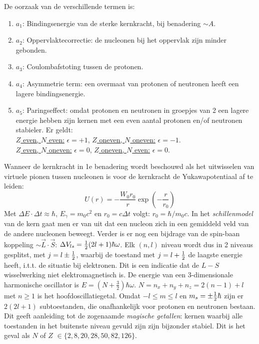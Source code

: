 De oorzaak van de verschillende termen is:
\begin{enumerate}
\item $a_1$: Bindingsenergie van de sterke kernkracht, bij benadering $\sim A$.
\item $a_2$: Oppervlaktecorrectie: de nucleonen bij het oppervlak zijn minder
             gebonden.
\item $a_3$: Coulombafstoting tussen de protonen.
\item $a_4$: Asymmetrie term: een overmaat van protonen of neutronen heeft een
             lagere bindingsenergie.
\item $a_5$: Paringseffect: omdat protonen en neutronen in groepjes van 2
             een lagere energie hebben zijn kernen met een even aantal
             protonen en/of neutronen stabieler. Er geldt:\\[2mm]
             \underline{$Z$ even, $N$ even:} $\epsilon=+1$,
             \underline{$Z$ oneven, $N$ oneven:} $\epsilon=-1$.\\
             \underline{$Z$ even, $N$ oneven:} $\epsilon=0$,
             \underline{$Z$ oneven, $N$ even:} $\epsilon=0$.
\end{enumerate}
Wanneer de kernkracht in 1e benadering wordt beschouwd als het uitwisselen
van virtuele pionen tussen nucleonen is voor de kernkracht de
Yukawapotentiaal af te leiden:
\[
U(r)=-\frac{W_0r_0}{r}\exp\left(-\frac{r}{r_0}\right)
\]
Met $\Delta E\cdot\Delta t\approx\hbar$, $E_\gamma=m_0c^2$ en $r_0=c\Delta t$
volgt: $r_0=\hbar/m_0c$.
\npar
In het {\it schillenmodel} van de kern gaat men er van uit dat een nucleon
zich in een gemiddeld veld van de andere nucleonen beweegt. Verder is er
nog een bijdrage van de spin-baan koppeling $\sim\vec{L}\cdot\vec{S}$:
$\Delta V_{ls}=\mbox{$\frac{1}{2}$}(2l+1)\hbar\omega$. Elk $(n,l)$ niveau wordt dus in
2 niveaus gesplitst, met $j=l\pm\mbox{$\frac{1}{2}$}$, waarbij de toestand met $j=l+\mbox{$\frac{1}{2}$}$
de laagste energie heeft, i.t.t. de situatie bij elektronen. Dit is een
indicatie dat de $L-S$ wisselwerking niet elektromagnetisch is. De energie
van een 3-dimensionale harmonische oscillator is $E=(N+\frac{3}{2})\hbar\omega$.
$N=n_x+n_y+n_z=2(n-1)+l$ met $n\geq1$ is het hoofdoscillatiegetal. Omdat
$-l\leq m\leq l$ en $m_s=\pm\mbox{$\frac{1}{2}$}\hbar$ zijn er $2(2l+1)$ subtoestanden, die
onafhankelijk voor protonen en neutronen bestaan. Dit geeft aanleiding tot de
zogenaamde {\it magische getallen}: kernen waarbij alle toestanden in het
buitenste niveau gevuld zijn zijn bijzonder stabiel. Dit is het geval als
$N$ of $Z$ $\in\{2,8,20,28,50,82,126\}$.

